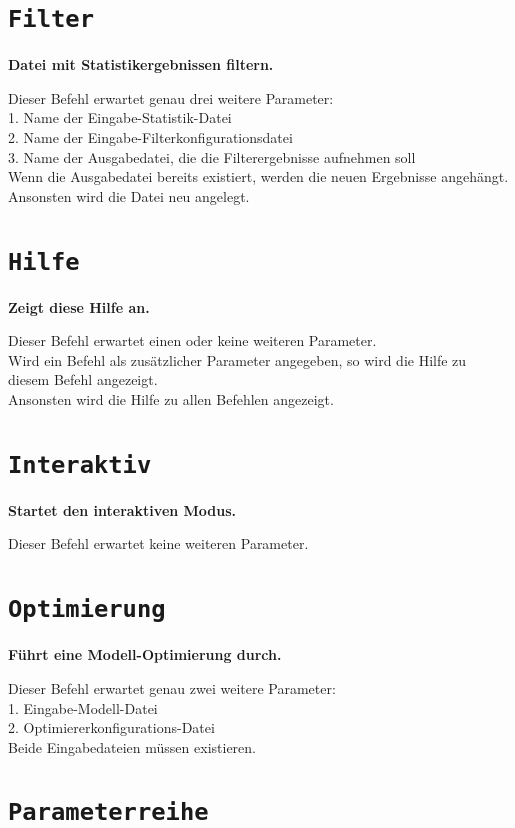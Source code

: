 \section{\texttt{Filter}}

\textbf{Datei mit Statistikergebnissen filtern.}

Dieser Befehl erwartet genau drei weitere Parameter:\\
1. Name der Eingabe-Statistik-Datei\\
2. Name der Eingabe-Filterkonfigurationsdatei\\
3. Name der Ausgabedatei, die die Filterergebnisse aufnehmen soll\\
Wenn die Ausgabedatei bereits existiert, werden die neuen Ergebnisse angehängt.\\
Ansonsten wird die Datei neu angelegt.

\section{\texttt{Hilfe}}

\textbf{Zeigt diese Hilfe an.}

Dieser Befehl erwartet einen oder keine weiteren Parameter.\\
Wird ein Befehl als zusätzlicher Parameter angegeben, so wird die Hilfe zu diesem Befehl angezeigt.\\
Ansonsten wird die Hilfe zu allen Befehlen angezeigt.

\section{\texttt{Interaktiv}}

\textbf{Startet den interaktiven Modus.}

Dieser Befehl erwartet keine weiteren Parameter.

\section{\texttt{Optimierung}}

\textbf{Führt eine Modell-Optimierung durch.}

Dieser Befehl erwartet genau zwei weitere Parameter:\\
1. Eingabe-Modell-Datei\\
2. Optimiererkonfigurations-Datei\\
Beide Eingabedateien müssen existieren.

\section{\texttt{Parameterreihe}}

